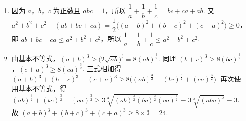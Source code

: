 \begin{solution}
\begin{enumerate}
\item 因为 \(a\)，\(b\)，\(c\) 为正数且 \(abc=1\)，所以 \(\dfrac1a+\dfrac1b+\dfrac1c=bc+ca+ab\). 又 \(a^2+b^2+c^2-(ab+bc+ca)=\dfrac12\bigl((a-b)^2+(b-c)^2+(c-a)^2\bigr)\ge0\)，即 \(ab+bc+ca\le a^2+b^2+c^2\)，所以 \(\dfrac1a+\dfrac1b+\dfrac1c\le a^2+b^2+c^2\).
\item 由基本不等式，\((a+b)^3\ge\bigl(2\sqrt{ab}\bigr)^3=8(ab)^{\frac{3}{2}}\). 同理 \((b+c)^3\ge8(bc)^{\frac{3}{2}}\)，\((c+a)^3\ge8(ca)^{\frac{3}{2}}\). 三式相加得 \((a+b)^3+(b+c)^3+(c+a)^3\ge8\bigl((ab)^{\frac{3}{2}}+(bc)^{\frac{3}{2}}+(ca)^{\frac{3}{2}}\bigr)\). 再次使用基本不等式，得 \((ab)^{\frac{3}{2}}+(bc)^{\frac{3}{2}}+(ca)^{\frac{3}{2}}\ge3\sqrt[3]{(ab)^{\frac{3}{2}}(bc)^{\frac{3}{2}}(ca)^{\frac{3}{2}}}=3\sqrt[3]{(abc)^3}=3\). 故 \((a+b)^3+(b+c)^3+(c+a)^3\ge8\times3=24\).
\end{enumerate}
\end{solution}
